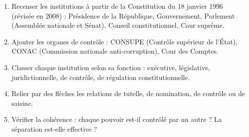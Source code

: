 \documentclass[11pt]{article}
\begin{document}
\begin{methode}[Démarche du TP 1]
\begin{enumerate}
\item Recenser les institutions à partir de la Constitution du 18 janvier 1996 (révisée en 2008) : Présidence de la République, Gouvernement, Parlement (Assemblée nationale et Sénat), Conseil constitutionnel, Cour suprême.
\item Ajouter les organes de contrôle : CONSUPE (Contrôle supérieur de l'État), CONAC (Commission nationale anti-corruption), Cour des Comptes.
\item Classer chaque institution selon sa fonction : exécutive, législative, juridictionnelle, de contrôle, de régulation constitutionnelle.
\item Relier par des flèches les relations de tutelle, de nomination, de contrôle ou de saisine.
\item Vérifier la cohérence : chaque pouvoir est-il contrôlé par un autre ? La séparation est-elle effective ?
\end{enumerate}
\end{methode}
\end{document}
